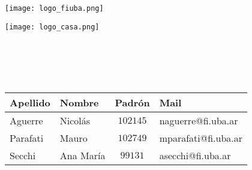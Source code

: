 \documentclass[
10pt, %
a4paper, %
oneside, %
headinclude,footinclude, %
BCOR5mm, %
]{scrartcl}
\begin{document}
\begin{titlepage}
    \begin{center}
	\hfill\texttt{[image: logo\_fiuba.png]}\\
    \centerline{\texttt{[image: logo\_casa.png]}}
    \vfill
    \\
    \Large{}\\
    \vskip2cm
    \\
    \vfill
    \Large\begin{table}[hbt]
    \caption*{} %
    \centering
    \begin{tabular}{llcl} %
    \toprule
    Apellido & Nombre & Padrón & Mail \\
    \midrule
    Aguerre & Nicolás & $102145$ & naguerre@fi.uba.ar \\
    Parafati & Mauro & $102749$ & mparafati@fi.uba.ar \\
    Secchi & Ana María & $99131$ & asecchi@fi.uba.ar \\
    \bottomrule
    \end{tabular}
    \label{tab:label}
    \end{table}
    \vskip1cm
    \end{center}
\end{titlepage}


\renewcommand{\sectionmark}[1]{\markright{\spacedlowsmallcaps{#1}}} %
\lehead{\mbox{\llap{\small\thepage\kern1em\color{halfgray} \vline}\color{halfgray}\hspace{0.5em}\rightmark\hfil}} %

\pagestyle{scrheadings} %

\end{document}
